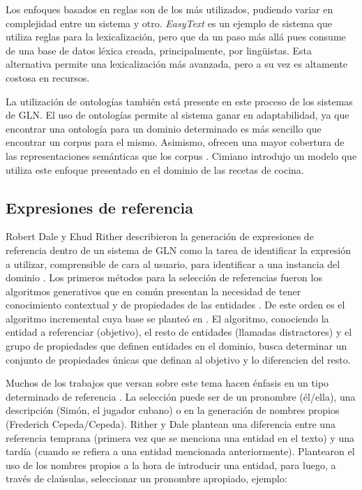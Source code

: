     Los enfoques basados en reglas son de los m\'as utilizados, pudiendo variar en complejidad entre un sistema y otro. \textit{EasyText} 
es un ejemplo de sistema que utiliza reglas para la lexicalización, pero que da un paso m\'as all\'a pues consume de una base de datos 
l\'exica creada, principalmente, por lingüistas. Esta alternativa permite una lexicalización m\'as avanzada, pero a su vez es altamente 
costosa en recursos.

    La utilizaci\'on de ontolog\'ias tambi\'en est\'a presente en este proceso de los sistemas de GLN. El uso de ontologías permite 
al sistema ganar en adaptabilidad, ya que encontrar una ontología para un dominio determinado es más sencillo que encontrar un corpus para 
el mismo. Asimismo, ofrecen una mayor cobertura de las representaciones semánticas que los corpus . Cimiano  introdujo 
un modelo que utiliza este enfoque presentado en el dominio de las recetas de cocina.


\subsection{Expresiones de referencia}\label{subsection:expreferencia}

    Robert Dale y Ehud Rither describieron la generación de expresiones de referencia dentro de un sistema de GLN como la tarea de 
identificar la expresión a utilizar, comprensible de cara al usuario, para identificar a una instancia del dominio . 
Los primeros m\'etodos para la selección de referencias fueron los algoritmos generativos que en común presentan la necesidad de tener conocimiento 
contextual y de propiedades de las entidades . De este orden es el algoritmo incremental cuya base se plante\'o en . 
El algoritmo, conociendo la entidad a referenciar (objetivo), el resto de entidades (llamadas distractores) y el grupo de propiedades que definen entidades en el dominio,
busca determinar un conjunto de propiedades \'unicas que definan al objetivo y lo diferencien del resto.

    Muchos de los trabajos que versan sobre este tema hacen énfasis en un tipo determinado de referencia . La selección 
puede ser de un pronombre (\'el/ella), una descripci\'on (Sim\'on, el jugador cubano) o en la generación de nombres propios (Frederich Cepeda/Cepeda). 
Rither y Dale  plantean una diferencia entre una referencia temprana (primera vez que se menciona una 
entidad en el texto) y una tard\'ia (cuando se refiera a una entidad mencionada anteriormente). Plantearon el uso de los nombres propios a la hora 
de introducir una entidad, para luego, a través de claúsulas, seleccionar un pronombre apropiado, ejemplo:

